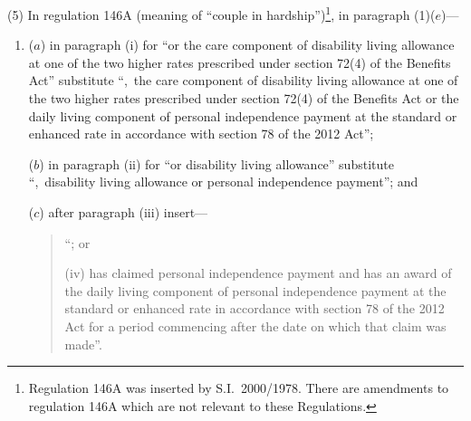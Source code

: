 \documentclass[12pt,a4paper]{article}
\begin{document}
(5) In regulation 146A (meaning of “couple in hardship”)\footnote{Regulation 146A was inserted by S.I.~2000/1978. There are amendments to regulation 146A which are not relevant to these Regulations.}, in paragraph (1)($e$)—
\begin{enumerate}\item[]
($a$) in paragraph (i)  for “or the care component of disability living allowance at one of the two higher rates prescribed under section 72(4) of the Benefits Act” substitute “,~the care component of disability living allowance at one of the two higher rates prescribed under section 72(4) of the Benefits Act or the daily living component of personal independence payment at the standard or enhanced rate in accordance with section 78 of the 2012 Act”;

($b$) in paragraph (ii)  for “or disability living allowance” substitute “,~disability living allowance or personal independence payment”; and

($c$) after paragraph (iii)  insert—
\begin{quotation}
“; or

(iv) has claimed personal independence payment and has an award of the daily living component of personal independence payment at the standard or enhanced rate in accordance with section 78 of the 2012 Act for a period commencing after the date on which that claim was made”.
\end{quotation}
\end{enumerate}
\end{document}
